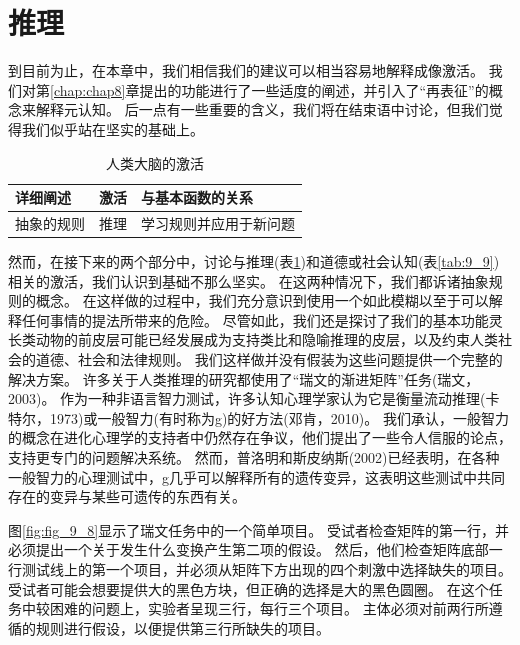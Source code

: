 \section{推理}

到目前为止，在本章中，我们相信我们的建议可以相当容易地解释成像激活。
我们对第\ref{chap:chap8}章提出的功能进行了一些适度的阐述，并引入了“再表征”的概念来解释元认知。
后一点有一些重要的含义，我们将在结束语中讨论，但我们觉得我们似乎站在坚实的基础上。



\par
\begin{table}[htbp] 
	\newcommand{\tabincell}[2]{\begin{tabular}{@{}#1@{}}#2\end{tabular}} %
	\centering
	\caption{人类大脑的激活\label{tab:9_8}}
	\renewcommand\arraystretch{1.5}	%
	\begin{tabular}{lll}
		\toprule
		详细阐述 & 激活 & 与基本函数的关系\\
		\midrule
		抽象的规则 & 推理 & 学习规则并应用于新问题  \\
		
		\bottomrule
		
	\end{tabular}%
\end{table}%


然而，在接下来的两个部分中，讨论与推理(表\ref{tab:9_8})和道德或社会认知(表\ref{tab:9_9})相关的激活，我们认识到基础不那么坚实。
在这两种情况下，我们都诉诸抽象规则的概念。
在这样做的过程中，我们充分意识到使用一个如此模糊以至于可以解释任何事情的提法所带来的危险。
尽管如此，我们还是探讨了我们的基本功能灵长类动物的前皮层可能已经发展成为支持类比和隐喻推理的皮层，以及约束人类社会的道德、社会和法律规则。
我们这样做并没有假装为这些问题提供一个完整的解决方案。
许多关于人类推理的研究都使用了“瑞文的渐进矩阵”任务(瑞文，2003)。
作为一种非语言智力测试，许多认知心理学家认为它是衡量流动推理(卡特尔，1973)或一般智力(有时称为g)的好方法(邓肯，2010)。
我们承认，一般智力的概念在进化心理学的支持者中仍然存在争议，他们提出了一些令人信服的论点，支持更专门的问题解决系统。
然而，普洛明和斯皮纳斯(2002)已经表明，在各种一般智力的心理测试中，g几乎可以解释所有的遗传变异，这表明这些测试中共同存在的变异与某些可遗传的东西有关。


图\ref{fig:fig_9_8}显示了瑞文任务中的一个简单项目。
受试者检查矩阵的第一行，并必须提出一个关于发生什么变换产生第二项的假设。
然后，他们检查矩阵底部一行测试线上的第一个项目，并必须从矩阵下方出现的四个刺激中选择缺失的项目。
受试者可能会想要提供大的黑色方块，但正确的选择是大的黑色圆圈。
在这个任务中较困难的问题上，实验者呈现三行，每行三个项目。
主体必须对前两行所遵循的规则进行假设，以便提供第三行所缺失的项目。



